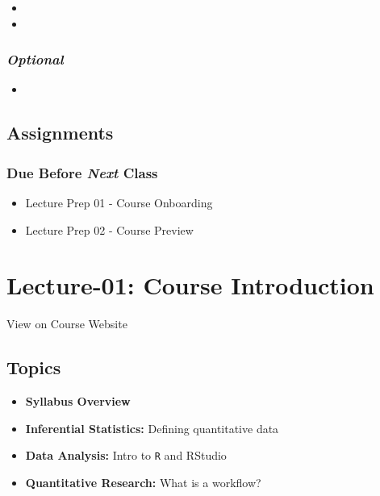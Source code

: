 \documentclass[]{book}
\providecommand{\tightlist}{%
  \setlength{\itemsep}{0pt}\setlength{\parskip}{0pt}}
\theoremstyle{definition}
\theoremstyle{definition}
\theoremstyle{definition}
\theoremstyle{remark}
\begin{document}
\begin{itemize}
\item
\item
\end{itemize}

\subsubsection*{\texorpdfstring{\emph{Optional}}{Optional}}\label{optional}

\begin{itemize}
\item
\end{itemize}

\subsection*{Assignments}\label{assignments-1}

\subsubsection*{\texorpdfstring{Due Before \emph{Next}
Class}{Due Before Next Class}}\label{due-before-next-class}

\begin{itemize}
\tightlist
\item
  Lecture Prep 01 - Course Onboarding
\item
  Lecture Prep 02 - Course Preview
\end{itemize}

\section{Lecture-01: Course
Introduction}\label{lecture-01-course-introduction}

View on Course Website

\subsection*{Topics}\label{topics-1}

\begin{itemize}
\tightlist
\item
  \textbf{Syllabus Overview}
\item
  \textbf{Inferential Statistics:} Defining quantitative data
\item
  \textbf{Data Analysis:} Intro to \texttt{R} and RStudio
\item
  \textbf{Quantitative Research:} What is a workflow?
\end{itemize}
\end{document}
